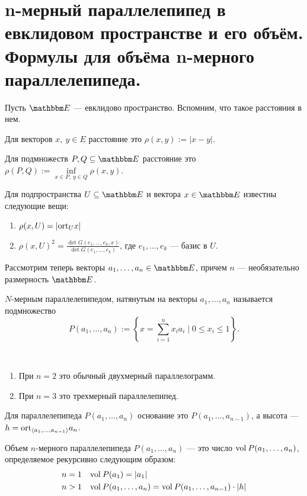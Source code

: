 \section{n-мерный параллелепипед в евклидовом пространстве и его объём. Формулы для объёма n-мерного параллелепипеда.}

Пусть $\E$ --- евклидово пространство. Вспомним, что такое расстояния в нем.

Для векторов $x,\ y \in E$ расстояние это $\rho(x, y):= |x - y|$.

Для подмножеств $P, Q \subseteq \E$ расстояние это $\rho(P, Q) := \inf\limits_{x \in P,\ y \in Q} \rho(x, y)$.

Для подпространства $U \subseteq \E$ и вектора $x \in \E$ известны следующие вещи:
\begin{enumerate}
\item $\rho(x, U) = |\mathrm{ort}_Ux|$
\item $\rho(x, U)^2 = \frac{\det G(e_1, \ldots, e_k, x)}{\det G(e_1, \ldots, e_k)}$, где $e_1, \ldots, e_k$ --- базис в $U$.
\end{enumerate}

Рассмотрим теперь векторы $a_1, \ldots, a_n \in \E$, причем $n$ --- необязательно размерность $\E$.
\begin{Def}
$N$-мерным параллелепипедом, натянутым на векторы $a_1, \ldots, a_n$ называется подмножество 
$$
P(a_1, \ldots, a_n) := \left\{ x = \sum_{i = 1}^n x_ia_i \mid 0 \leqslant x_i \leqslant 1 \right\}.
$$  
\end{Def}

\begin{Examples}\
\begin{enumerate}
\item При $n = 2$ это обычный двухмерный параллелограмм.
\item При $n = 3$ это трехмерный параллелепипед.
\end{enumerate}
\end{Examples}

\begin{Def}
Для параллелепипеда $P(a_1, \ldots, a_{n})$ основание это $P(a_1, \ldots, a_{n-1})$, а высота --- $h = \mathrm{ort}_{\langle a_1, \ldots, a_{n-1}\rangle}a_n$.
\end{Def}

\begin{Def}
Объем $n$-мерного параллелепипеда $P(a_1, \ldots, a_{n})$ --- это число $\mathrm{vol\:} P(a_1, \ldots, a_{n})$, определяемое рекурсивно следующим образом:
\begin{align*}
n = 1 \quad& \mathrm{vol\:} P(a_1) = |a_1| \\
n > 1 \quad& \mathrm{vol\:} P(a_1, \ldots, a_n) = \mathrm{vol\:} P(a_1, \ldots, a_{n-1})\cdot |h|
\end{align*}
\end{Def}

